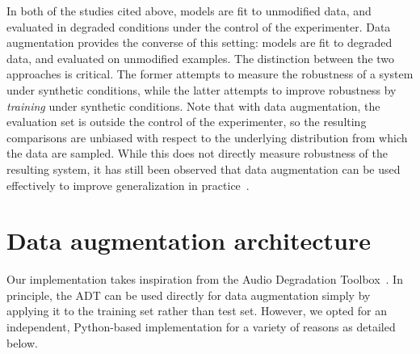 \documentclass{article}
\begin{document}
In both of the studies cited above, models are fit to unmodified data, and evaluated in
degraded conditions under the control of the experimenter.  
Data augmentation provides the converse of this setting: models are fit to degraded data, 
and evaluated on unmodified examples.  The distinction between the two approaches is
critical.  The former attempts to measure the robustness of a system under synthetic
conditions, while the latter attempts to improve robustness by \emph{training} under
synthetic conditions. Note that with data augmentation, the evaluation set is outside 
the control of the experimenter, so the resulting comparisons are unbiased with respect
to the underlying distribution from which the data are sampled.  While this does not
directly measure robustness of the resulting system, it has still been observed that data
augmentation can be used effectively to improve generalization in
practice~\cite{krizhevsky2012imagenet}.


\section{Data augmentation architecture}

%
%
Our implementation takes inspiration from the Audio Degradation
Toolbox~\cite{mauch2013audio}.  In principle, the ADT can be used directly 
for data augmentation simply by applying it to the training set rather than test set.
However, we opted for an independent, Python-based implementation for a variety of
reasons as detailed below.
\end{document}
